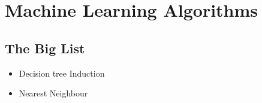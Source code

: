 \chapter{Machine Learning Algorithms}

\section{The Big List}
\begin{itemize}
\item Decision tree Induction
\item Nearest Neighbour

\end{itemize}


